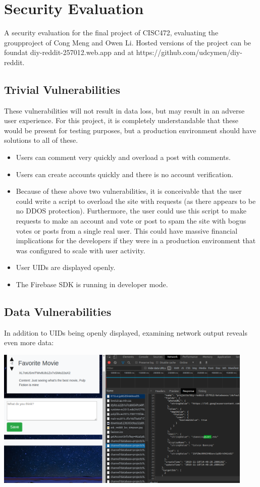 %
%
\chapter{Security Evaluation}
A security evaluation for the final project of CISC472, evaluating the groupproject of Cong Meng and Owen Li. Hosted versions of the project can be foundat diy-reddit-257012.web.app and at https://github.com/udcymen/diy-reddit.

\section{Trivial Vulnerabilities}

These vulnerabilities will not result in data loss, but may result in an adverse user experience. For this project, it is completely understandable that these would be present for testing purposes, but a production environment should have solutions to all of these.
\begin{itemize}
    \item Users can comment very quickly and overload a post with comments.
    \item Users can create accounts quickly and there is no account verification.
    \item Because of these above two vulnerabilities, it is conceivable that the user could write a script to overload the site with requests (as there appears to be no DDOS protection). Furthermore, the user could use this script to make requests to make an account and vote or post to spam the site with bogus votes or posts from a single real user. This could have massive financial implications for the developers if they were in a production environment that was configured to scale with user activity.
    \item User UIDs are displayed openly.
    \item The Firebase SDK is running in developer mode.
\end{itemize}

\section{Data Vulnerabilities}
In addition to UIDs being openly displayed, examining network output reveals even more data:

\includegraphics[width = 350pt]{images/info.png}

